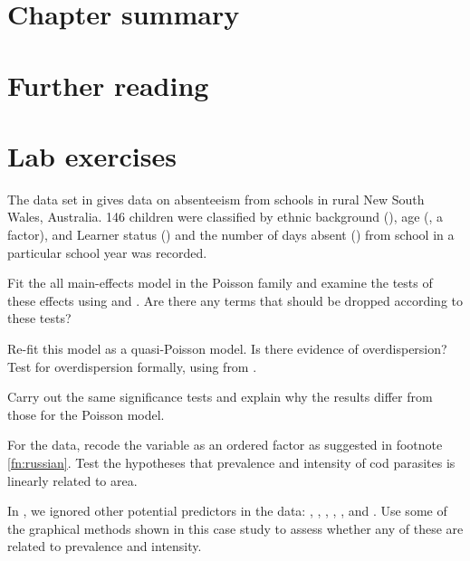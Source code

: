 \documentclass[11pt]{book}\usepackage[]{graphicx}\usepackage[]{color}
\begin{document}
\section{Chapter summary} 


\section{Further reading}

\section{Lab exercises}

\begin{Exercises}

  \exercise The data set  in  gives data on absenteeism from schools in rural New South Wales, Australia.
   146 children were classified by ethnic background (), age (, a factor),  and Learner status ()
   and the number of days absent () from school 
   in a particular school year was recorded. 
   \begin{enumerate*}
    \item Fit the all main-effects model in the Poisson family and examine the tests of these effects using
     and .  Are there any terms that should be dropped according to these tests?
    \item Re-fit this model as a quasi-Poisson model.  Is there evidence of overdispersion?  
    Test for overdispersion formally, using  from .
    \item Carry out the same significance tests and explain why the results differ from those for the Poisson model.
   \end{enumerate*}
   
  \exercise For the  data, recode the  variable as an ordered factor as suggested in
  footnote \ref{fn:russian}.  Test the hypotheses that prevalence and intensity of cod parasites is linearly 
  related to area.
  
  \exercise In , we ignored other potential predictors in the  data:
  , , , , , and .
  Use some of the graphical methods shown in this case study to assess whether any of these are related
  to prevalence and intensity.
  

\end{Exercises}
\end{document}
